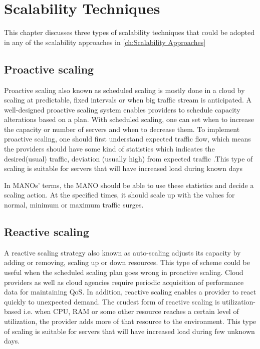 \chapter{Scalability Techniques}
\label{ch:Scalability Techniques}

This chapter discusses three types of scalability techniques that could be adopted in any of the scalability approaches in \ref{ch:Scalability Approaches}

\section{Proactive scaling}

Proactive scaling also known as scheduled scaling is mostly done in a cloud by scaling at predictable, fixed intervals or when big traffic stream is anticipated. A well-designed proactive scaling system enables providers to schedule capacity alterations based on a plan.
With scheduled scaling, one can set when to increase the capacity or number of servers and when to decrease them. To implement proactive scaling, one should first understand expected traffic flow, which means the providers should have some kind of statistics which indicates the desired(usual) traffic, deviation (usually high) from expected traffic \cite{falatah_cloud_2014}\cite{reese_cloud_nodate}.This type of scaling is suitable for servers that will have increased load during known days 

In MANOs' terms, the MANO should be able to use these statistics and decide a scaling action. At the specified times, it should scale up with the values for normal, minimum or maximum traffic surges.


\section{Reactive scaling}

A reactive scaling strategy also known as auto-scaling adjusts its capacity by adding or removing, scaling up or down resources.
This type of scheme could be useful when the scheduled scaling plan goes wrong in proactive scaling. Cloud providers as well as cloud agencies require periodic acquisition of performance data for maintaining QoS. In addition, reactive scaling enables a provider to react quickly to unexpected demand. The crudest form of reactive scaling is utilization-based i.e. when  CPU, RAM  or some other resource reaches a certain level of  utilization, the provider adds  more of that resource to the environment\cite{falatah_cloud_2014}\cite{reese_cloud_nodate}. This type of scaling is suitable for servers that will have increased load during few unknown days.

